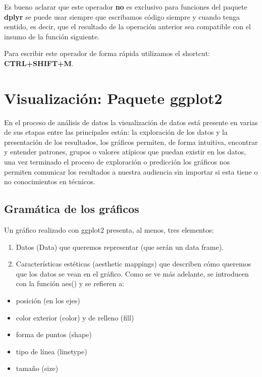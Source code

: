 \documentclass[
  12pt,
]{book}
\providecommand{\tightlist}{%
  \setlength{\itemsep}{0pt}\setlength{\parskip}{0pt}}
\begin{document}
Es bueno aclarar que este operador \textbf{no} es exclusivo para funciones del paquete \textbf{dplyr} se puede usar siempre que escribamos código siempre y cuando tenga sentido, es decir, que el resultado de la operación anterior sea compatible con el insumo de la función siguiente.

Para escribir este operador de forma rápida utilizamos el shortcut: \textbf{CTRL+SHIFT+M}.

\hypertarget{visualizaciuxf3n-paquete-ggplot2}{%
\chapter{\texorpdfstring{\textbf{Visualización: Paquete ggplot2}}{Visualización: Paquete ggplot2}}\label{visualizaciuxf3n-paquete-ggplot2}}

En el proceso de análisis de datos la visualización de datos está presente en varias de sus etapas entre las principales están: la exploración de los datos y la presentación de los resultados, los gráficos permiten, de forma intuitiva, encontrar y entender patrones, grupos o valores atípicos que puedan existir en los datos, una vez terminado el proceso de exploración o predicción los gráficos nos permiten comunicar los resultados a nuestra audiencia sin importar si esta tiene o no conocimientos en técnicos.

\hypertarget{gramuxe1tica-de-los-gruxe1ficos}{%
\section{\texorpdfstring{\textbf{Gramática de los gráficos}}{Gramática de los gráficos}}\label{gramuxe1tica-de-los-gruxe1ficos}}

Un gráfico realizado con ggplot2 presenta, al menos, tres elementos:

\begin{enumerate}
\def\labelenumi{\arabic{enumi}.}
\item
  Datos (Data) que queremos representar (que serán un data frame).
\item
  Características estéticas (aesthetic mappings) que describen cómo queremos que los datos se vean en el gráfico. Como se ve más adelante, se introducen con la función aes() y se refieren a:
\end{enumerate}

\begin{itemize}
\tightlist
\item
  posición (en los ejes)
\item
  color exterior (color) y de relleno (fill)
\item
  forma de puntos (shape)
\item
  tipo de línea (linetype)
\item
  tamaño (size)
\end{itemize}
\end{document}
